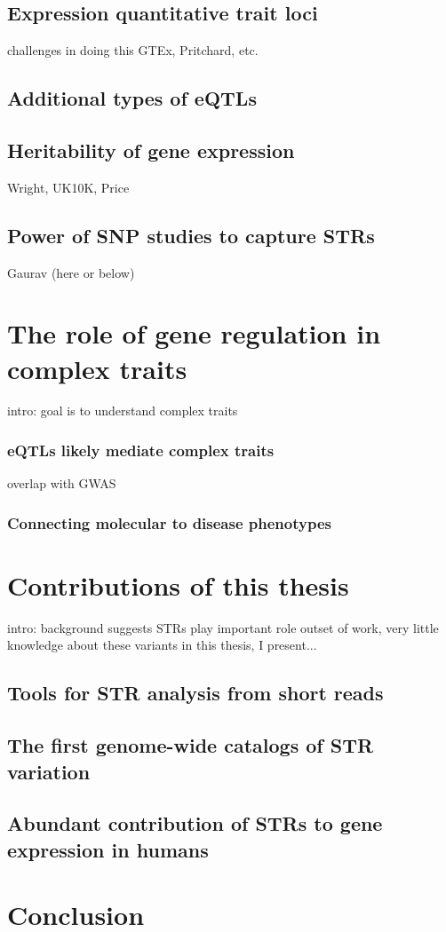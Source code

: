 \subsection{Expression quantitative trait loci}
challenges in doing this
GTEx, Pritchard, etc.
\subsection{Additional types of eQTLs}
\subsection{Heritability of gene expression}
Wright, UK10K, Price
\subsection{Power of SNP studies to capture STRs}
Gaurav (here or below)

\section{The role of gene regulation in complex traits}
intro: goal is to understand complex traits
\subsubsection{eQTLs likely mediate complex traits}
overlap with GWAS
\subsubsection{Connecting molecular to disease phenotypes}

\section{Contributions of this thesis}
intro: background suggests STRs play important role
outset of work, very little knowledge about these variants
in this thesis, I present...
\subsection{Tools for STR analysis from short reads}
\subsection{The first genome-wide catalogs of STR variation}
\subsection{Abundant contribution of STRs to gene expression in humans}

\section{Conclusion}